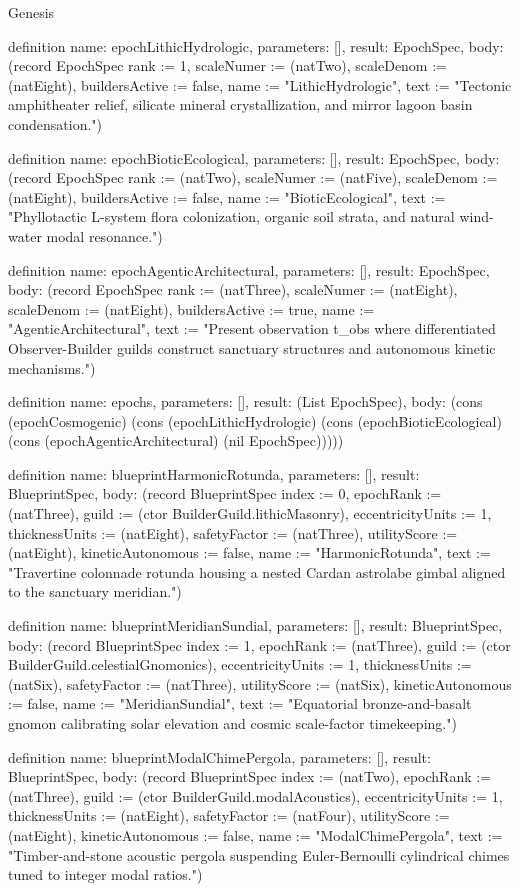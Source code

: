 \begin{lexlean}{Genesis}
\begin{semanticmodule}
definition{
  name: epochLithicHydrologic,
  parameters: [],
  result: EpochSpec,
  body: (record EpochSpec {rank := 1, scaleNumer := (natTwo), scaleDenom := (natEight), buildersActive := false, name := "LithicHydrologic", text := "Tectonic amphitheater relief, silicate mineral crystallization, and mirror lagoon basin condensation."})
}

definition{
  name: epochBioticEcological,
  parameters: [],
  result: EpochSpec,
  body: (record EpochSpec {rank := (natTwo), scaleNumer := (natFive), scaleDenom := (natEight), buildersActive := false, name := "BioticEcological", text := "Phyllotactic L-system flora colonization, organic soil strata, and natural wind-water modal resonance."})
}

definition{
  name: epochAgenticArchitectural,
  parameters: [],
  result: EpochSpec,
  body: (record EpochSpec {rank := (natThree), scaleNumer := (natEight), scaleDenom := (natEight), buildersActive := true, name := "AgenticArchitectural", text := "Present observation t_obs where differentiated Observer-Builder guilds construct sanctuary structures and autonomous kinetic mechanisms."})
}

definition{
  name: epochs,
  parameters: [],
  result: (List EpochSpec),
  body: (cons (epochCosmogenic) (cons (epochLithicHydrologic) (cons (epochBioticEcological) (cons (epochAgenticArchitectural) (nil EpochSpec)))))
}

definition{
  name: blueprintHarmonicRotunda,
  parameters: [],
  result: BlueprintSpec,
  body: (record BlueprintSpec {index := 0, epochRank := (natThree), guild := (ctor BuilderGuild.lithicMasonry), eccentricityUnits := 1, thicknessUnits := (natEight), safetyFactor := (natThree), utilityScore := (natEight), kineticAutonomous := false, name := "HarmonicRotunda", text := "Travertine colonnade rotunda housing a nested Cardan astrolabe gimbal aligned to the sanctuary meridian."})
}

definition{
  name: blueprintMeridianSundial,
  parameters: [],
  result: BlueprintSpec,
  body: (record BlueprintSpec {index := 1, epochRank := (natThree), guild := (ctor BuilderGuild.celestialGnomonics), eccentricityUnits := 1, thicknessUnits := (natSix), safetyFactor := (natThree), utilityScore := (natSix), kineticAutonomous := false, name := "MeridianSundial", text := "Equatorial bronze-and-basalt gnomon calibrating solar elevation and cosmic scale-factor timekeeping."})
}

definition{
  name: blueprintModalChimePergola,
  parameters: [],
  result: BlueprintSpec,
  body: (record BlueprintSpec {index := (natTwo), epochRank := (natThree), guild := (ctor BuilderGuild.modalAcoustics), eccentricityUnits := 1, thicknessUnits := (natEight), safetyFactor := (natFour), utilityScore := (natEight), kineticAutonomous := false, name := "ModalChimePergola", text := "Timber-and-stone acoustic pergola suspending Euler-Bernoulli cylindrical chimes tuned to integer modal ratios."})
}


\end{semanticmodule}
\end{lexlean}
